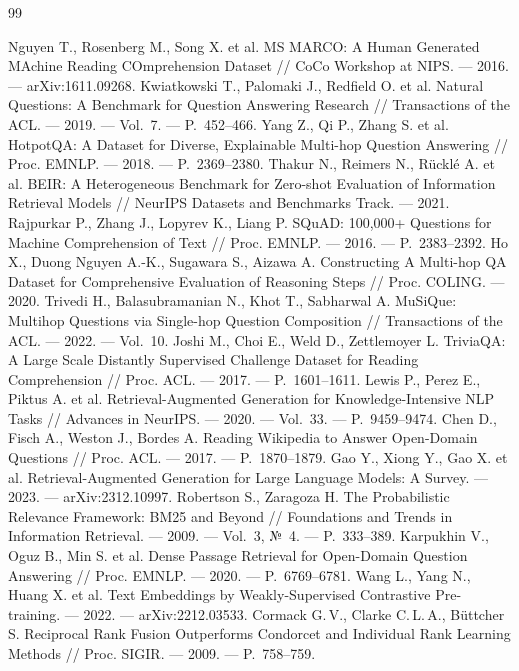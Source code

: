 \begin{thebibliography}{99}
\small
{} Nguyen T., Rosenberg M., Song X. et al. MS MARCO: A Human Generated MAchine Reading COmprehension Dataset // CoCo Workshop at NIPS. --- 2016. --- arXiv:1611.09268.
 Kwiatkowski T., Palomaki J., Redfield O. et al. Natural Questions: A Benchmark for Question Answering Research // Transactions of the ACL. --- 2019. --- Vol.~7. --- P.~452--466.
 Yang Z., Qi P., Zhang S. et al. HotpotQA: A Dataset for Diverse, Explainable Multi-hop Question Answering // Proc. EMNLP. --- 2018. --- P.~2369--2380.
 Thakur N., Reimers N., Rücklé A. et al. BEIR: A Heterogeneous Benchmark for Zero-shot Evaluation of Information Retrieval Models // NeurIPS Datasets and Benchmarks Track. --- 2021.
 Rajpurkar P., Zhang J., Lopyrev K., Liang P. SQuAD: 100,000+ Questions for Machine Comprehension of Text // Proc. EMNLP. --- 2016. --- P.~2383--2392.
 Ho X., Duong Nguyen A.-K., Sugawara S., Aizawa A. Constructing A Multi-hop QA Dataset for Comprehensive Evaluation of Reasoning Steps // Proc. COLING. --- 2020.
 Trivedi H., Balasubramanian N., Khot T., Sabharwal A. MuSiQue: Multihop Questions via Single-hop Question Composition // Transactions of the ACL. --- 2022. --- Vol.~10.
 Joshi M., Choi E., Weld D., Zettlemoyer L. TriviaQA: A Large Scale Distantly Supervised Challenge Dataset for Reading Comprehension // Proc. ACL. --- 2017. --- P.~1601--1611.
 Lewis P., Perez E., Piktus A. et al. Retrieval-Augmented Generation for Knowledge-Intensive NLP Tasks // Advances in NeurIPS. --- 2020. --- Vol.~33. --- P.~9459--9474.
 Chen D., Fisch A., Weston J., Bordes A. Reading Wikipedia to Answer Open-Domain Questions // Proc. ACL. --- 2017. --- P.~1870--1879.
 Gao Y., Xiong Y., Gao X. et al. Retrieval-Augmented Generation for Large Language Models: A Survey. --- 2023. --- arXiv:2312.10997.
 Robertson S., Zaragoza H. The Probabilistic Relevance Framework: BM25 and Beyond // Foundations and Trends in Information Retrieval. --- 2009. --- Vol.~3, №~4. --- P.~333--389.
 Karpukhin V., Oguz B., Min S. et al. Dense Passage Retrieval for Open-Domain Question Answering // Proc. EMNLP. --- 2020. --- P.~6769--6781.
 Wang L., Yang N., Huang X. et al. Text Embeddings by Weakly-Supervised Contrastive Pre-training. --- 2022. --- arXiv:2212.03533.
 Cormack G.\,V., Clarke C.\,L.\,A., Büttcher S. Reciprocal Rank Fusion Outperforms Condorcet and Individual Rank Learning Methods // Proc. SIGIR. --- 2009. --- P.~758--759.

\end{thebibliography}
